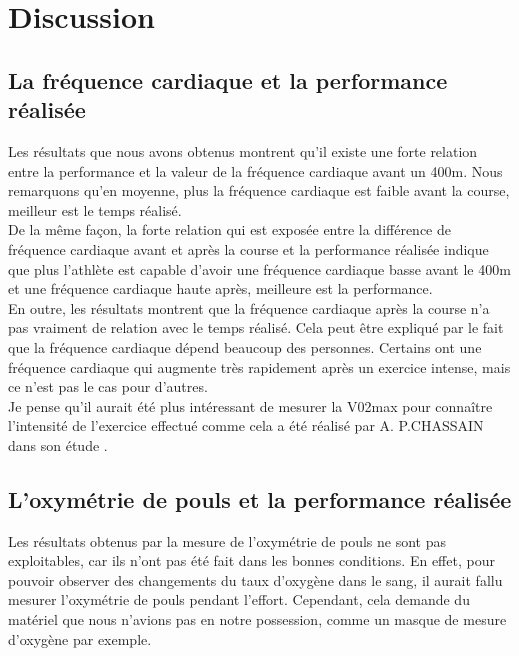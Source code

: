         
    \section{Discussion}
    
        \subsection{La fréquence cardiaque et la performance réalisée}
        
        Les résultats que nous avons obtenus montrent qu'il existe une forte relation entre la performance et la valeur de la fréquence cardiaque avant un 400m. Nous remarquons qu'en moyenne, plus la fréquence cardiaque est faible avant la course, meilleur est le temps réalisé.\\
        
        De la même façon, la forte relation qui est exposée entre la différence de fréquence cardiaque avant et après la course et la performance réalisée indique que plus l'athlète est capable d'avoir une fréquence cardiaque basse avant le 400m et une fréquence cardiaque haute après, meilleure est la performance. \\
        
        En outre, les résultats montrent que la fréquence cardiaque après la course n'a pas vraiment de relation avec le temps réalisé. Cela peut être expliqué par le fait que la fréquence cardiaque dépend beaucoup des personnes. Certains ont une fréquence cardiaque qui augmente très rapidement après un exercice intense, mais ce n'est pas le cas pour d'autres.\\
        
        Je pense qu'il aurait été plus intéressant de mesurer la V02max pour connaître l'intensité de l'exercice effectué comme cela a été réalisé par A. P.CHASSAIN dans son étude \cite{chassain86}.
       

        \subsection{L'oxymétrie de pouls et la performance réalisée}
         
        Les résultats obtenus par la mesure de l'oxymétrie de pouls ne sont pas exploitables, car ils n'ont pas été fait dans les bonnes conditions. En effet, pour pouvoir observer des changements du taux d'oxygène dans le sang, il aurait fallu mesurer l'oxymétrie de pouls pendant l'effort. Cependant, cela demande du matériel que nous n'avions pas en notre possession, comme un masque de mesure d'oxygène par exemple.
         
